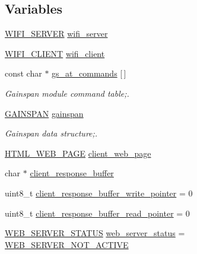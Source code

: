 \subsection*{Variables}
\begin{DoxyCompactItemize}
\item 
\hyperlink{group__wireless__interface_struct_w_i_f_i___s_e_r_v_e_r}{W\+I\+F\+I\+\_\+\+S\+E\+R\+V\+ER} \hyperlink{group__wireless__interface_gae4c1511ca93f3701dbf5b10cf287b2ad}{wifi\+\_\+server}
\item 
\hyperlink{group__wireless__interface_struct_w_i_f_i___c_l_i_e_n_t}{W\+I\+F\+I\+\_\+\+C\+L\+I\+E\+NT} \hyperlink{group__wireless__interface_gadbbf854f2e0f87372c26b3d29eedfd73}{wifi\+\_\+client}
\item 
const char $\ast$ \hyperlink{group__wireless__interface_gac38a44d54dfb9bc52a44c22fc1cb0599}{gs\+\_\+at\+\_\+commands} \mbox{[}$\,$\mbox{]}
\begin{DoxyCompactList}\small\item\em Gainspan module command table;. \end{DoxyCompactList}\item 
\hyperlink{group__wireless__interface_struct_g_a_i_n_s_p_a_n}{G\+A\+I\+N\+S\+P\+AN} \hyperlink{group__wireless__interface_ga6ca64d92ac8c97336c5b12c1c7bd314c}{gainspan}
\begin{DoxyCompactList}\small\item\em Gainspan data structure;. \end{DoxyCompactList}\item 
\hyperlink{group__wireless__interface_struct_h_t_m_l___w_e_b___p_a_g_e}{H\+T\+M\+L\+\_\+\+W\+E\+B\+\_\+\+P\+A\+GE} \hyperlink{group__wireless__interface_ga89c8d1fbc038a4f41cb713ec8b7fcd23}{client\+\_\+web\+\_\+page}
\item 
char $\ast$ \hyperlink{group__wireless__interface_gae1c59ff89e7cf7528ed8df534e67b568}{client\+\_\+response\+\_\+buffer}
\item 
uint8\+\_\+t \hyperlink{group__wireless__interface_ga3b5ad9fbc3f1f6ef9340e180a86d75c0}{client\+\_\+response\+\_\+buffer\+\_\+write\+\_\+pointer} = 0
\item 
uint8\+\_\+t \hyperlink{group__wireless__interface_ga46a00362b669fe2b4dc08b9c2c983675}{client\+\_\+response\+\_\+buffer\+\_\+read\+\_\+pointer} = 0
\item 
\hyperlink{group__wireless__interface_gaf8c02aba93d7bcb5ecf758d4b9f2db53}{W\+E\+B\+\_\+\+S\+E\+R\+V\+E\+R\+\_\+\+S\+T\+A\+T\+US} \hyperlink{group__wireless__interface_gaf05beffcad5d1d2018a346cfc8c813a1}{web\+\_\+server\+\_\+status} = \hyperlink{group__wireless__interface_ggaf8c02aba93d7bcb5ecf758d4b9f2db53a5236a8f0be55d19397fc6d251c8782d8}{W\+E\+B\+\_\+\+S\+E\+R\+V\+E\+R\+\_\+\+N\+O\+T\+\_\+\+A\+C\+T\+I\+VE}
\end{DoxyCompactItemize}


